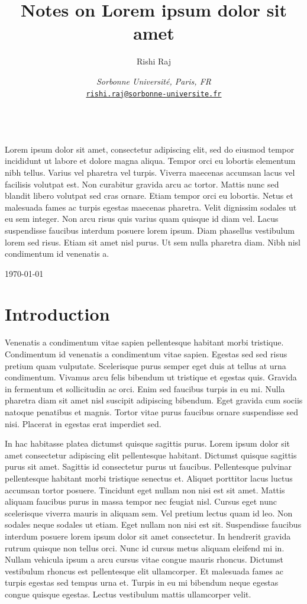 \documentclass[12pt, a4paper]{article}
\title{Notes on Lorem ipsum dolor sit amet}
\author{Rishi Raj}
\date{
    \noindent\textit{Sorbonne Université, Paris, FR}\\[0.2cm]
    \href{mailto:rishiraj.1012exp@gmail.com}{\texttt{rishi.raj@sorbonne-universite.fr}}
}
\numberwithin{equation}{section}
\renewenvironment{abstract}
 {\par\noindent\textbf{\abstractname}\ \ignorespaces\\[1ex]}
 {\par\medskip}
\begin{document}
\thispagestyle{empty}
\maketitle

\begin{abstract}
  Lorem ipsum dolor sit amet, consectetur adipiscing elit, sed do eiusmod tempor incididunt ut labore et dolore magna aliqua. Tempor orci eu lobortis elementum nibh tellus. Varius vel pharetra vel turpis. Viverra maecenas accumsan lacus vel facilisis volutpat est. Non curabitur gravida arcu ac tortor. Mattis nunc sed blandit libero volutpat sed cras ornare. Etiam tempor orci eu lobortis. Netus et malesuada fames ac turpis egestas maecenas pharetra. Velit dignissim sodales ut eu sem integer. Non arcu risus quis varius quam quisque id diam vel. Lacus suspendisse faucibus interdum posuere lorem ipsum. Diam phasellus vestibulum lorem sed risus. Etiam sit amet nisl purus. Ut sem nulla pharetra diam. Nibh nisl condimentum id venenatis a.
\end{abstract}

\noindent\today

\tableofcontents

\setlength{\parindent}{1ex}
\setlength{\parskip}{2ex}
\raggedright

\section{Introduction}

Venenatis a condimentum vitae sapien pellentesque habitant morbi tristique. Condimentum id venenatis a condimentum vitae sapien. Egestas sed sed risus pretium quam vulputate. Scelerisque purus semper eget duis at tellus at urna condimentum. Vivamus arcu felis bibendum ut tristique et egestas quis. Gravida in fermentum et sollicitudin ac orci. Enim sed faucibus turpis in eu mi. Nulla pharetra diam sit amet nisl suscipit adipiscing bibendum. Eget gravida cum sociis natoque penatibus et magnis. Tortor vitae purus faucibus ornare suspendisse sed nisi. Placerat in egestas erat imperdiet sed.

In hac habitasse platea dictumst quisque sagittis purus. Lorem ipsum dolor sit amet consectetur adipiscing elit pellentesque habitant. Dictumst quisque sagittis purus sit amet. Sagittis id consectetur purus ut faucibus. Pellentesque pulvinar pellentesque habitant morbi tristique senectus et. Aliquet porttitor lacus luctus accumsan tortor posuere. Tincidunt eget nullam non nisi est sit amet. Mattis aliquam faucibus purus in massa tempor nec feugiat nisl. Cursus eget nunc scelerisque viverra mauris in aliquam sem. Vel pretium lectus quam id leo. Non sodales neque sodales ut etiam. Eget nullam non nisi est sit. Suspendisse faucibus interdum posuere lorem ipsum dolor sit amet consectetur. In hendrerit gravida rutrum quisque non tellus orci. Nunc id cursus metus aliquam eleifend mi in. Nullam vehicula ipsum a arcu cursus vitae congue mauris rhoncus. Dictumst vestibulum rhoncus est pellentesque elit ullamcorper. Et malesuada fames ac turpis egestas sed tempus urna et. Turpis in eu mi bibendum neque egestas congue quisque egestas. Lectus vestibulum mattis ullamcorper velit.
\end{document}
